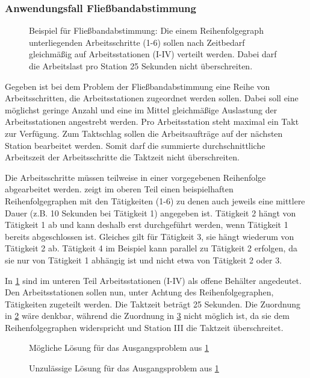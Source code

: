 \subsubsection{Anwendungsfall Fließbandabstimmung}\label{subsec:anwendungsfall-fliessbandabstimmung}

\begin{figure}[h]
    \centering
    \caption{%
    \label{fig:balancing}
    Beispiel für Fließbandabstimmung: Die einem Reihenfolgegraph unterliegenden Arbeitsschritte (1-6)
        sollen nach Zeitbedarf gleichmäßig auf Arbeitsstationen (I-IV) verteilt werden.
        Dabei darf die Arbeitslast pro Station 25 Sekunden nicht überschreiten.}
\end{figure}

Gegeben ist bei dem Problem der Fließbandabstimmung eine Reihe von Arbeitsschritten, die Arbeitsstationen zugeordnet werden sollen.
Dabei soll eine möglichst geringe Anzahl und eine im Mittel gleichmäßige Auslastung der Arbeitsstationen angestrebt werden.
Pro Arbeitsstation steht maximal ein Takt zur Verfügung. Zum Taktschlag sollen die Arbeitsaufträge auf der nächsten Station bearbeitet werden.
Somit darf die summierte durchschnittliche Arbeitszeit der Arbeitsschritte die Taktzeit nicht überschreiten.

Die Arbeitsschritte müssen teilweise in einer vorgegebenen Reihenfolge abgearbeitet werden.
 zeigt im oberen Teil einen beispielhaften Reihenfolgegraphen
mit den Tätigkeiten (1-6) zu denen auch jeweils eine mittlere Dauer
(z.B. 10 Sekunden bei Tätigkeit 1) angegeben ist.
Tätigkeit 2 hängt von Tätigkeit 1 ab und kann deshalb erst durchgeführt werden,
wenn Tätigkeit 1 bereits abgeschlossen ist.
Gleiches gilt für Tätigkeit 3, sie hängt wiederum von Tätigkeit 2 ab.
Tätigkeit 4 im Beispiel kann parallel zu Tätigkeit 2 erfolgen,
da sie nur von Tätigkeit 1 abhängig ist und nicht etwa von Tätigkeit 2 oder 3.

In \cref{fig:balancing} sind im unteren Teil Arbeitsstationen (I-IV) als offene Behälter angedeutet.
Den Arbeitsstationen sollen nun, unter Achtung des Reihenfolgegraphen, Tätigkeiten zugeteilt werden.
Die Taktzeit beträgt 25 Sekunden. Die Zuordnung in \cref{fig:solution_ok} wäre denkbar,
während die Zuordnung in \cref{fig:solution_fail} nicht möglich ist, da sie dem
Reihenfolgegraphen widerspricht und Station III die Taktzeit überschreitet.

\begin{figure}[h]
    \centering
    \caption{Mögliche Lösung für das Ausgangsproblem aus \cref{fig:balancing}}
    \label{fig:solution_ok}
\end{figure}
\begin{figure}[h]
    \centering
    \caption{Unzulässige Lösung für das Ausgangsproblem aus \cref{fig:balancing}}
    \label{fig:solution_fail}
\end{figure}

